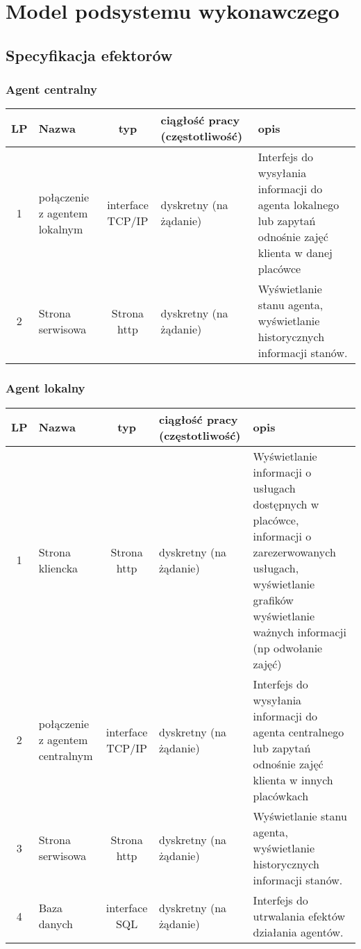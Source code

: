 \section{Model podsystemu wykonawczego}
\subsection{Specyfikacja efektorów}

\subsubsection{Agent centralny}

\begin{tabular}{c|p{3cm}|c|p{2cm}|p{4cm}}
LP		& Nazwa			& typ			& ciągłość pracy (częstotliwość) & opis \\
\hline
1		& połączenie z agentem lokalnym	& interface TCP/IP	& dyskretny (na żądanie) & Interfejs do wysyłania informacji do agenta lokalnego lub zapytań odnośnie zajęć klienta w danej placówce \\
2		& Strona serwisowa 	& Strona http	& dyskretny (na żądanie)	& Wyświetlanie stanu agenta, wyświetlanie historycznych informacji stanów.\\
\end{tabular}

\subsubsection{Agent lokalny}

\begin{tabular}{c|p{3cm}|c|p{2cm}|p{4cm}}
LP		& Nazwa			& typ		& ciągłość pracy (częstotliwość)	& opis \\
\hline
1		& Strona kliencka		& Strona http	& dyskretny (na żądanie)	& Wyświetlanie informacji o usługach dostępnych w placówce, informacji o zarezerwowanych usługach, wyświetlanie grafików wyświetlanie ważnych informacji (np odwołanie zajęć)\\
2		& połączenie z agentem centralnym		& interface TCP/IP & dyskretny (na żądanie)	& Interfejs do wysyłania informacji do agenta centralnego lub zapytań odnośnie zajęć klienta w innych placówkach \\
3		& Strona serwisowa		& Strona http	& dyskretny (na żądanie)	& Wyświetlanie stanu agenta, wyświetlanie historycznych informacji stanów.\\
4		& Baza danych		& interface SQL	& dyskretny (na żądanie) & Interfejs do utrwalania efektów działania agentów.
\end{tabular}



